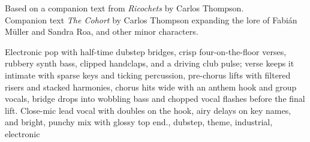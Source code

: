 

\begin{notes}
Based on a companion text from \emph{Ricochets} by Carlos Thompson.\\
Companion text \emph{The Cohort} by Carlos Thompson expanding the lore of Fabián Müller and Sandra Roa, and other minor characters.
\end{notes}

\begin{style}
Electronic pop with half-time dubstep bridges, crisp four-on-the-floor verses, rubbery synth bass, clipped handclaps, and a driving club pulse; verse keeps it intimate with sparse keys and ticking percussion, pre-chorus lifts with filtered risers and stacked harmonies, chorus hits wide with an anthem hook and group vocals, bridge drops into wobbling bass and chopped vocal flashes before the final lift. %
Close-mic lead vocal with doubles on the hook, airy delays on key names, and bright, punchy mix with glossy top end., dubstep, theme, industrial, electronic
\end{style}

